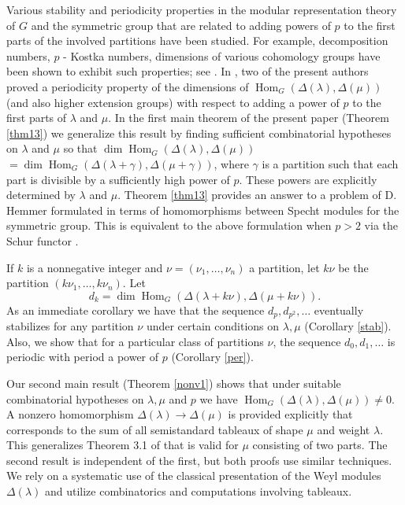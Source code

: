 \documentclass[ALCO,Unicode]{cedram}
\DeclareMathOperator{\Hom}{Hom}
\numberwithin{equation}{section}
\begin{document}
Various stability and periodicity properties in the modular representation theory of $G$ and the symmetric group that are related to adding powers of $p$ to the first parts of the involved partitions have  been studied. For example, decomposition numbers, $p$ - Kostka numbers, dimensions of various cohomology groups have been shown to exhibit such properties; see \cite{Gi, Ha, HK, Hen, NS}. In \cite[Theorem 1.1(1)]{MS4}, two of the present authors proved a periodicity property of the dimensions of $\Hom_G(\Delta(\lambda), \Delta(\mu))$ (and also higher extension groups) with respect to adding a power of $p$ to the first parts of $\lambda$ and $\mu$. In the first main theorem of the present paper (Theorem \ref{thm13})  we generalize this result by finding sufficient combinatorial hypotheses on $\lambda$ and $\mu$ so that $\dim\Hom_G(\Delta(\lambda), \Delta(\mu)) $ $=\dim\Hom_G(\Delta(\lambda +\gamma),\Delta(\mu + \gamma))$, where $\gamma$ is a partition such that each part is divisible by a  sufficiently high power of $p$. These powers are explicitly determined by $\lambda$ and $\mu$. Theorem \ref{thm13} provides an answer to a problem  of D. Hemmer \cite[Problem 5.4]{Hem2} formulated in terms of homomorphisms between Specht modules for the symmetric group. This is equivalent to the above formulation when $p>2$ via the Schur functor \cite{Gr}. 

If $k$ is a nonnegative integer and $\nu=(\nu_1,\dots,\nu_n)$ a partition, let $k\nu$ be the partition $(k\nu_1,\dots,k\nu_n).$ Let \[d_k=\dim \Hom _{G}(\Delta (\lambda + k \nu), \Delta(\mu + k \nu)).\]As an immediate corollary we have  that the sequence $d_{p}, d_{p^2}, \dots$ eventually stabilizes for any partition $\nu$ under certain conditions on $\lambda, \mu$ (Corollary \ref{stab}). Also, we show that for a particular class of partitions $\nu$, the sequence $d_{0}, d_1, \dots$ is periodic with period a power of $p$ (Corollary \ref{per}).

Our second main result (Theorem \ref{nonv1}) shows that under suitable combinatorial hypotheses on $\lambda, \mu$ and $p$ we have $\Hom_G(\Delta(\lambda), \Delta(\mu)) \neq 0$. A nonzero homomorphism $\Delta (\lambda) \to \Delta (\mu)$ is provided explicitly that corresponds to the sum of all semistandard tableaux of shape $\mu$ and weight $\lambda$. This generalizes Theorem 3.1 of \cite{MS3} that is valid for $\mu$ consisting of two parts. The second result is independent of the first, but both proofs use similar techniques. We rely on a systematic use of the classical presentation of the Weyl modules $\Delta(\lambda)$ and utilize combinatorics and computations involving tableaux.
\end{document}
